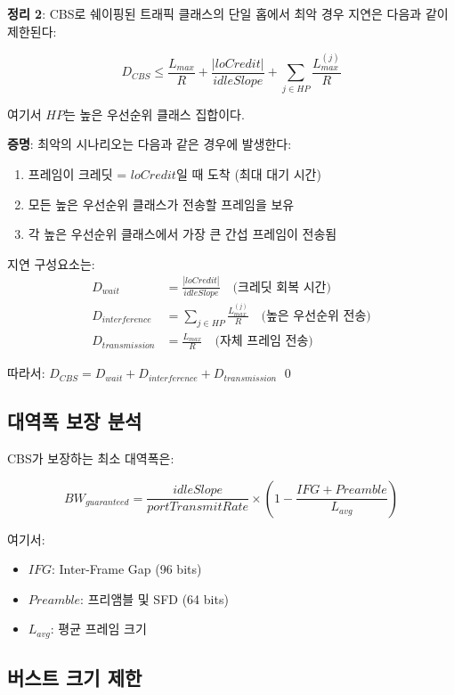 \documentclass[twocolumn,10pt]{article}
\begin{document}
\textbf{정리 2}: CBS로 쉐이핑된 트래픽 클래스의 단일 홉에서 최악 경우 지연은 다음과 같이 제한된다:

\begin{equation}
D_{CBS} \leq \frac{L_{max}}{R} + \frac{|loCredit|}{idleSlope} + \sum_{j \in HP} \frac{L_{max}^{(j)}}{R}
\end{equation}

여기서 $HP$는 높은 우선순위 클래스 집합이다.

\textbf{증명}: 최악의 시나리오는 다음과 같은 경우에 발생한다:
\begin{enumerate}
    \item 프레임이 크레딧 = $loCredit$일 때 도착 (최대 대기 시간)
    \item 모든 높은 우선순위 클래스가 전송할 프레임을 보유
    \item 각 높은 우선순위 클래스에서 가장 큰 간섭 프레임이 전송됨
\end{enumerate}

지연 구성요소는:
\begin{align}
D_{wait} &= \frac{|loCredit|}{idleSlope} \quad \text{(크레딧 회복 시간)} \\
D_{interference} &= \sum_{j \in HP} \frac{L_{max}^{(j)}}{R} \quad \text{(높은 우선순위 전송)} \\
D_{transmission} &= \frac{L_{max}}{R} \quad \text{(자체 프레임 전송)}
\end{align}

따라서: $D_{CBS} = D_{wait} + D_{interference} + D_{transmission}$ \qed

\subsection{대역폭 보장 분석}

CBS가 보장하는 최소 대역폭은:

\begin{equation}
BW_{guaranteed} = \frac{idleSlope}{portTransmitRate} \times \left(1 - \frac{IFG + Preamble}{L_{avg}}\right)
\end{equation}

여기서:
\begin{itemize}
    \item $IFG$: Inter-Frame Gap (96 bits)
    \item $Preamble$: 프리앰블 및 SFD (64 bits)
    \item $L_{avg}$: 평균 프레임 크기
\end{itemize}

\subsection{버스트 크기 제한}
\end{document}
